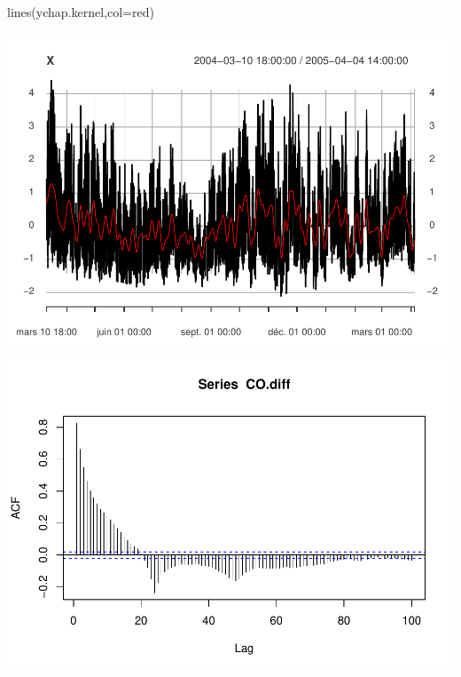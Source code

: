 \documentclass[
]{article}
\newenvironment{Shaded}{\begin{snugshade}}{\end{snugshade}}
\newcommand{\AttributeTok}[1]{\textcolor[rgb]{0.77,0.63,0.00}{#1}}
\newcommand{\CommentTok}[1]{\textcolor[rgb]{0.56,0.35,0.01}{\textit{#1}}}
\newcommand{\FunctionTok}[1]{\textcolor[rgb]{0.00,0.00,0.00}{#1}}
\newcommand{\NormalTok}[1]{#1}
\newcommand{\OtherTok}[1]{\textcolor[rgb]{0.56,0.35,0.01}{#1}}
\newcommand{\SpecialCharTok}[1]{\textcolor[rgb]{0.00,0.00,0.00}{#1}}
\newcommand{\StringTok}[1]{\textcolor[rgb]{0.31,0.60,0.02}{#1}}
\begin{document}
\begin{Shaded}
\begin{Highlighting}[]
\FunctionTok{lines}\NormalTok{(ychap.kernel,}\AttributeTok{col=}\StringTok{\textquotesingle{}red\textquotesingle{}}\NormalTok{)}
\end{Highlighting}
\end{Shaded}

\includegraphics{STA202_report_files/figure-latex/tests-3.pdf}

\begin{Shaded}
\end{Shaded}

\includegraphics{STA202_report_files/figure-latex/unnamed-chunk-11-1.pdf}
\end{document}
